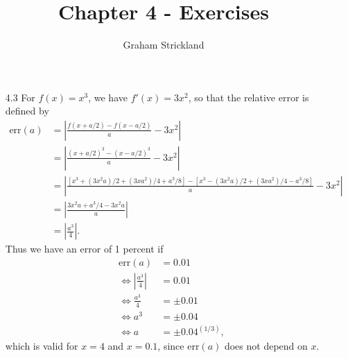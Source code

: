 \documentclass{article}
\title{Chapter 4 - Exercises}
\author{Graham Strickland}
\begin{document}
\maketitle  

\begin{itemize}
\item[4.3]
    For $f(x) = x^3$, we have $f'(x) = 3x^2$, so that the relative error is defined by
    \begin{equation*}
        \begin{split}
            \text{err}(a) &= \left| \frac{f(x + a/2) - f(x - a/2)}{a} - 3x^2 \right| \\
            &= \left| \frac{(x + a/2)^3 - (x - a/2)^3}{a} - 3x^2 \right| \\
            &= \left| \frac{[x^3 + (3x^2a)/2 + (3xa^2)/4 + a^3/8] - [x^3 - (3x^2a)/2 + (3xa^2)/4 - a^3/8]}{a} - 3x^2 \right| \\
            &= \left| \frac{3x^2a + a^3/4 - 3x^2a}{a} \right| \\
            &= \left| \frac{a^3}{4} \right|.
        \end{split}
    \end{equation*}
    \qquad Thus we have an error of 1 percent if 
    \begin{equation*}
        \begin{split}
            \text{err}(a) &= 0.01 \\
            \Leftrightarrow \left|\frac{a^3}{4}\right| &= 0.01 \\
            \Leftrightarrow \frac{a^3}{4} &= \pm 0.01 \\
            \Leftrightarrow a^3 &= \pm 0.04 \\
            \Leftrightarrow a &= \pm {0.04}^{(1/3)},
        \end{split}
    \end{equation*}
    which is valid for $x = 4$ and $x = 0.1$, since $\text{err}(a)$ does not depend on $x$.
\end{itemize}
\end{document}
